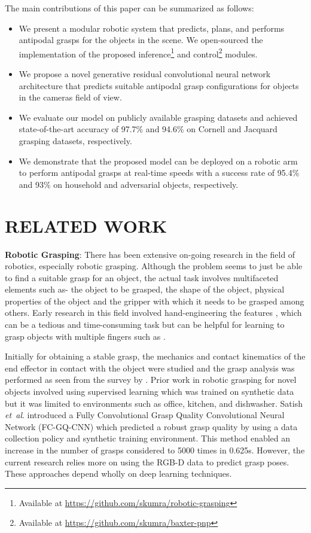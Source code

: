 \documentclass[letterpaper, 10pt, conference]{IEEEtran}
\newcommand{\etal}{\textit{et~al}. }
\begin{document}
The main contributions of this paper can be summarized as follows: 
\begin{itemize}
    \item We present a modular robotic system that predicts, plans, and performs antipodal grasps for the objects in the scene. We open-sourced the implementation of the proposed inference\footnote{Available at \href{https://github.com/skumra/robotic-grasping}{https://github.com/skumra/robotic-grasping}} and control\footnote{Available at \href{https://github.com/skumra/baxter-pnp}{https://github.com/skumra/baxter-pnp}} modules.
    \item We propose a novel generative residual convolutional neural network architecture that predicts suitable antipodal grasp configurations for objects in the camera\textquotesingle s field of view.
    \item We evaluate our model on publicly available grasping datasets and achieved state-of-the-art accuracy of 97.7\% and 94.6\% on Cornell and Jacquard grasping datasets, respectively.
    \item We demonstrate that the proposed model can be deployed on a robotic arm to perform antipodal grasps at real-time speeds with a success rate of 95.4\% and 93\% on household and adversarial objects, respectively.
\end{itemize}



\section{RELATED WORK}
\textbf{Robotic Grasping}: There has been extensive on-going research in the field of robotics, especially robotic grasping. Although the problem seems to just be able to find a suitable grasp for an object, the actual task involves multifaceted elements such as- the object to be grasped, the shape of the object, physical properties of the object and the gripper with which it needs to be grasped among others. Early research in this field involved hand-engineering the features \cite{maitin2010cloth,kragic2003robust}, which can be a tedious and time-consuming task but can be helpful for learning to grasp objects with multiple fingers such as \cite{kopicki2016one,bohg2013data}. 

Initially for obtaining a stable grasp, the mechanics and contact kinematics of the end effector in contact with the object were studied and the grasp analysis was performed as seen from the survey by \cite{bicchi2000robotic,shimoga1996robot}. Prior work \cite{saxena2008robotic} in robotic grasping for novel objects involved using supervised learning which was trained on synthetic data but it was limited to environments such as office, kitchen, and dishwasher. Satish \etal \cite{satish2019policy} introduced a Fully Convolutional Grasp Quality Convolutional Neural Network (FC-GQ-CNN) which predicted a robust grasp quality by using a data collection policy and synthetic training environment. This method enabled an increase in the number of grasps considered to 5000 times in 0.625s.
However, the current research relies more on using the RGB-D data to predict grasp poses. These approaches depend wholly on deep learning techniques.
\end{document}

